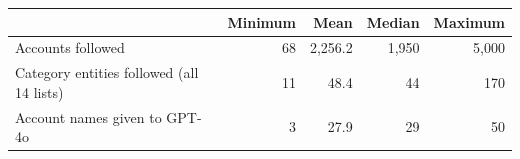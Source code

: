 \begin{tabular}{lrrrr}
\toprule
 & Minimum & Mean & Median & Maximum \\
\midrule
Accounts followed & 68 & 2,256.2 & 1,950 & 5,000 \\
Category entities followed (all 14 lists) & 11 & 48.4 & 44 & 170 \\
Account names given to GPT-4o & 3 & 27.9 & 29 & 50 \\
\bottomrule
\end{tabular}
